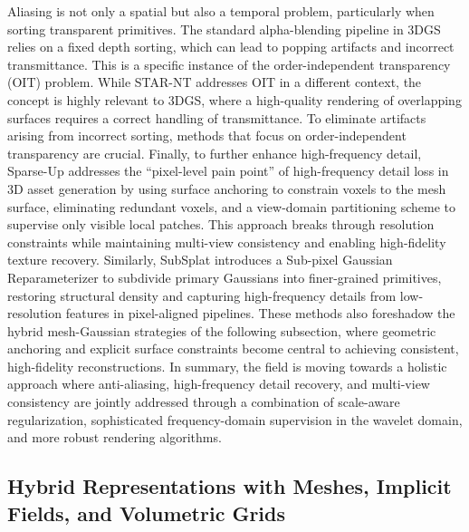 \documentclass[11pt]{article}
\begin{document}
Aliasing is not only a spatial but also a temporal problem, particularly when sorting transparent primitives. The standard alpha-blending pipeline in 3DGS relies on a fixed depth sorting, which can lead to popping artifacts and incorrect transmittance. This is a specific instance of the order-independent transparency (OIT) problem. While STAR-NT \cite{ref81} addresses OIT in a different context, the concept is highly relevant to 3DGS, where a high-quality rendering of overlapping surfaces requires a correct handling of transmittance. To eliminate artifacts arising from incorrect sorting, methods that focus on order-independent transparency are crucial. Finally, to further enhance high-frequency detail, Sparse-Up \cite{ref82} addresses the ``pixel-level pain point'' of high-frequency detail loss in 3D asset generation by using surface anchoring to constrain voxels to the mesh surface, eliminating redundant voxels, and a view-domain partitioning scheme to supervise only visible local patches. This approach breaks through resolution constraints while maintaining multi-view consistency and enabling high-fidelity texture recovery. Similarly, SubSplat \cite{ref83} introduces a Sub-pixel Gaussian Reparameterizer to subdivide primary Gaussians into finer-grained primitives, restoring structural density and capturing high-frequency details from low-resolution features in pixel-aligned pipelines. These methods also foreshadow the hybrid mesh-Gaussian strategies of the following subsection, where geometric anchoring and explicit surface constraints become central to achieving consistent, high-fidelity reconstructions. In summary, the field is moving towards a holistic approach where anti-aliasing, high-frequency detail recovery, and multi-view consistency are jointly addressed through a combination of scale-aware regularization, sophisticated frequency-domain supervision in the wavelet domain, and more robust rendering algorithms.

\subsection{Hybrid Representations with Meshes, Implicit Fields, and Volumetric Grids}
\end{document}
